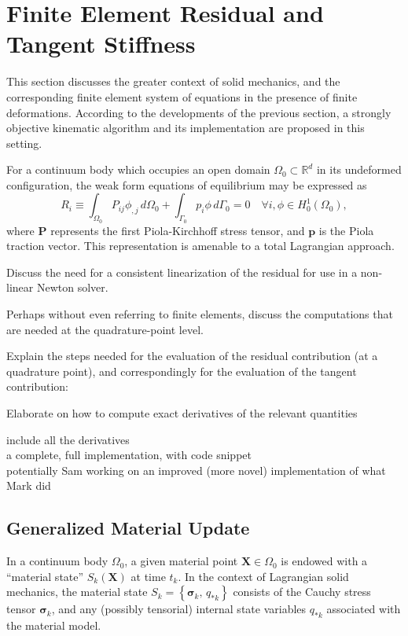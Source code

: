 \section{Finite Element Residual and Tangent Stiffness}
%

This section discusses the greater context of solid mechanics, and the corresponding finite element system of equations in the presence of finite deformations. According to the developments of the previous section, a strongly objective kinematic algorithm and its implementation are proposed in this setting.

For a continuum body which occupies an open domain $\Omega_0 \subset \mathbb{R}^d$ in its undeformed configuration, the weak form equations of equilibrium may be expressed as
\begin{equation}
    R_{i} \equiv \int_{\Omega_0} P_{ij} \phi_{,j} \, d \Omega_0 + \int_{\Gamma_0} p_i \phi \, d \Gamma_0 = 0 \quad \forall i, \phi \in H^1_0 (\Omega_0),
\end{equation}
where $\mathbf{P}$ represents the first Piola-Kirchhoff stress tensor, and $\mathbf{p}$ is the Piola traction vector. This representation is amenable to a total Lagrangian approach.

Discuss the need for a consistent linearization of the residual for use in a non-linear Newton solver.

Perhaps without even referring to finite elements, discuss the computations that are needed at the quadrature-point level.

Explain the steps needed for the evaluation of the residual contribution (at a quadrature point), and correspondingly for the evaluation of the tangent contribution:

Elaborate on how to compute exact derivatives of the relevant quantities

include all the derivatives\\
a complete, full implementation, with code snippet\\
potentially Sam working on an improved (more novel) implementation of what Mark did\\

\subsection{Generalized Material Update}

In a continuum body $\Omega_0$, a given material point $\mathbf{X} \in \Omega_0$ is endowed with a ``material state'' $S_k (\mathbf{X})$ at time $t_k$. In the context of Lagrangian solid mechanics, the material state $S_k = \left\{ \boldsymbol{\sigma}_{k}, \, q_{*k} \right\}$ consists of the Cauchy stress tensor $\boldsymbol{\sigma}_{k}$, and any (possibly tensorial) internal state variables $q_{*k}$ associated with the material model.

